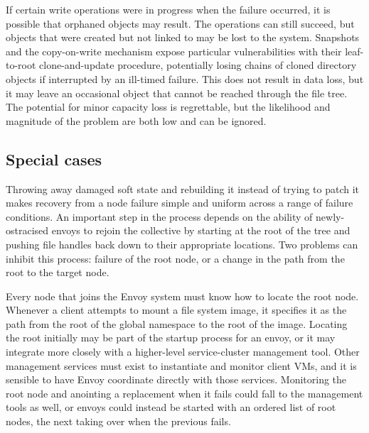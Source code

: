 If certain write operations were in progress when the failure occurred, it is possible that orphaned objects may result. The operations can still succeed, but objects that were created but not linked to may be lost to the system. Snapshots and the copy-on-write mechanism expose particular vulnerabilities with their leaf-to-root clone-and-update procedure, potentially losing chains of cloned directory objects if interrupted by an ill-timed failure. This does not result in data loss, but it may leave an occasional object that cannot be reached through the file tree. The potential for minor capacity loss is regrettable, but the likelihood and magnitude of the problem are both low and can be ignored.

\subsection{Special cases}

Throwing away damaged soft state and rebuilding it instead of trying to patch it makes recovery from a node failure simple and uniform across a range of failure conditions. An important step in the process depends on the ability of newly-ostracised envoys to rejoin the collective by starting at the root of the tree and pushing file handles back down to their appropriate locations. Two problems can inhibit this process: failure of the root node, or a change in the path from the root to the target node.

Every node that joins the Envoy system must know how to locate the root node. Whenever a client attempts to mount a file system image, it specifies it as the path from the root of the global namespace to the root of the image. Locating the root initially may be part of the startup process for an envoy, or it may integrate more closely with a higher-level service-cluster management tool. Other management services must exist to instantiate and monitor client VMs, and it is sensible to have Envoy coordinate directly with those services. Monitoring the root node and anointing a replacement when it fails could fall to the management tools as well, or envoys could instead be started with an ordered list of root nodes, the next taking over when the previous fails.


